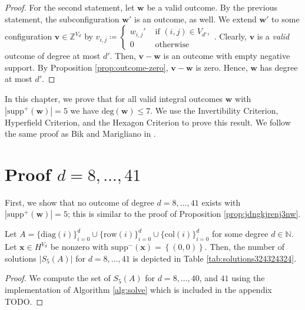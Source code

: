 \begin{proof}
    For the second statement, let \( \mathbf{w} \) be a valid outcome. By the previous statement, the subconfiguration \( \mathbf{w}' \) is an outcome, as well. We extend \( \mathbf{w}' \) to some configuration \( \mathbf{v} \in \mathbb{Z}^{V_d} \) by \( v_{i,j} \coloneqq \begin{cases}
        w_{i,j}' & \text{ if } (i,j) \in V_{d'}, \\
        0 & \text{ otherwise}
    \end{cases} \).
    Clearly, \( \mathbf{v} \) is a \emph{valid} outcome of degree at most \( d' \). Then, \( \mathbf{v} - \mathbf{w} \) is an outcome with empty negative support. By Proposition \ref{prop:outcome-zero}, \(  \mathbf{v} - \mathbf{w} \) is zero. Hence, \( \mathbf{w} \) has degree at most \( d' \).
\end{proof}



In this chapter, we prove that for all valid integral outcomes \( \mathbf w \) with \( |\mathrm{supp}^+(\mathbf w)| = 5 \) we have \( \mathrm{deg}(\mathbf w) \leq 7 \).
We use the Invertibility Criterion, Hyperfield Criterion, and the Hexagon Criterion to prove this result. We follow the same proof as Bik and Marigliano in \cite{bik2022classifying}.

\section{Proof \( d = 8, \dots, 41 \)}

First, we show that no outcome of degree \( d = 8, \dots, 41 \) exists with \( |\mathrm{supp}^+(\mathbf w)| = 5 \); this is similar to the proof of Proposition \ref{prop:jdngkjrenj3nw}.

\begin{proposition}
    Let $A = \{ \mathrm{diag}(i) \}_{i=0}^d \cup \{ \mathrm{row}(i)\}^d_{i=0} \cup \{ \mathrm{col}(i) \}^d_{i=0}$ for some degree \( d \in \mathbb{N} \). Let \( \mathbf{x} \in H^{V_d} \) be nonzero with \( \mathrm{supp}^-(\mathbf{x}) = \left\{ (0,0) \right\} \). Then, the number of solutions \( \lvert S_5(A) \rvert \) for \( d = 8, \dots, 41 \) is depicted in Table \ref{tab:solutions324324324}.
\end{proposition}

\begin{proof}
    We compute the set of \( S_5(A) \) for \( d = 8, \dots, 40 \), and \( 41 \) using the implementation of Algorithm \ref{alg:solve} which is included in the appendix TODO.
\end{proof}

